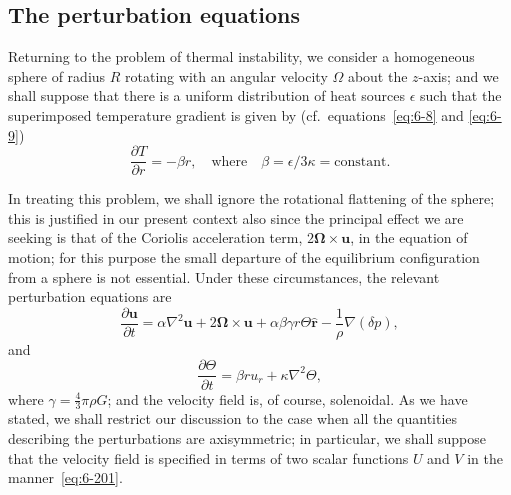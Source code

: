 \subsection{The perturbation equations}\label{sec:61b}
Returning to the problem of thermal instability, we consider a homo\-geneous sphere of radius $R$ rotating with an angular velocity $\Omega$ about the
$z$-axis; and we shall suppose that there is a uniform distribution of heat
sources $\epsilon$ such that the superimposed temperature gradient is given by
(cf.\ equations~\eqref{eq:6-8} and \eqref{eq:6-9})
\begin{equation}\label{eq:6-216}
\frac{\partial T}{\partial r} = -\beta r,\quad\text{where}\quad\beta = \epsilon/3\kappa = \text{constant.}
\end{equation}

In treating this problem, we shall ignore the rotational flattening of
the sphere; this is justified in our present context also since the principal
effect we are seeking is that of the Coriolis acceleration term, $2\boldsymbol{\Omega}\times\boldsymbol{u}$,
in the equation of motion; for this purpose the small departure of the
equilibrium configuration from a sphere is not essential. Under these
circumstances, the relevant perturbation equations are
\begin{equation}\label{eq:6-217}
\frac{\partial\boldsymbol{u}}{\partial t} = \alpha\nabla^2\boldsymbol{u} + 2\boldsymbol{\Omega}\times\boldsymbol{u} + \alpha\beta\gamma r\Theta\hat{\boldsymbol{r}} - \frac{1}{\rho}\nabla(\delta p),
\end{equation}
and
\begin{equation}\label{eq:6-218}
\frac{\partial\Theta}{\partial t} = \beta r u_r + \kappa\nabla^2\Theta,
\end{equation}
where $\gamma = \frac{4}{3}\pi\rho G$; and the velocity field is, of course, solenoidal.
As we have stated, we shall restrict our discussion to the case when all
the quantities describing the perturbations are axisymmetric; in par\-ticular, we shall suppose that the velocity field is specified in terms of
two scalar functions $U$ and $V$ in the manner~\eqref{eq:6-201}.

